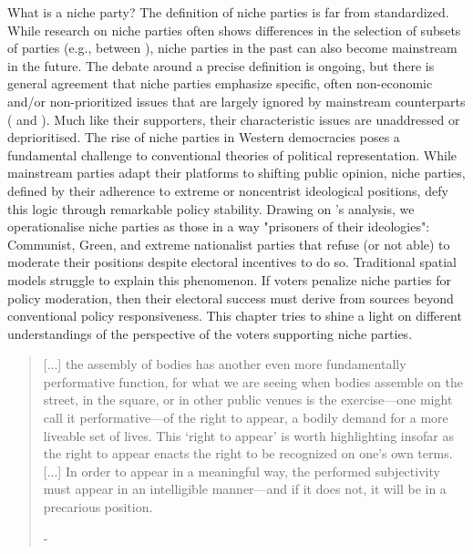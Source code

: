 What is a niche party? The definition of niche parties is far from standardized. While research on niche parties often shows differences in the selection of subsets of parties (e.g., between \cite{adams2006, nonnemacher2023}), niche parties in the past can also become mainstream in the future. The debate around a precise definition is ongoing, but there is general agreement that niche parties emphasize specific, often non-economic and/or non-prioritized issues that are largely ignored by mainstream counterparts (\cite[see 30]{nonnemacher2023} and \cite[1]{stiers2024}). Much like their supporters, their characteristic issues are unaddressed or deprioritised. The rise of niche parties in Western democracies poses a fundamental challenge to conventional theories of political representation. While mainstream parties adapt their platforms to shifting public opinion, niche parties, defined by their adherence to extreme or noncentrist ideological positions, defy this logic through remarkable policy stability. Drawing on \textcite{adams2006}'s analysis, we operationalise niche parties as those in a way "prisoners of their ideologies": Communist, Green, and extreme nationalist parties that refuse (or not able) to moderate their positions despite electoral incentives to do so. Traditional spatial models struggle to explain this phenomenon. If voters penalize niche parties for policy moderation, then their electoral success must derive from sources beyond conventional policy responsiveness. This chapter tries to shine a light on different understandings of the perspective of the voters supporting niche parties.


\begin{quote}
	[...] the assembly of bodies has another even more fundamentally performative function, for what we are seeing when bodies assemble on the street, in the square, or in other public venues is the exercise—one might call it performative—of the right to appear, a bodily demand for a more liveable set of lives. This ‘right to appear’ is worth highlighting insofar as the right to appear enacts the right to be recognized on one’s own terms. [...] In order to appear in a meaningful way, the performed subjectivity must appear in an intelligible manner—and if it does not, it will be in a precarious position.

	- \cite[7]{kim2024}
\end{quote}

